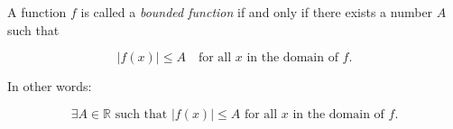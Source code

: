 \documentclass{article}
\begin{document}
A function \( f \) is called a \textit{bounded function} if and only if there exists a number \( A \) such that

\[
|f(x)| \leq A \quad \text{for all } x \text{ in the domain of } f.
\]

In other words:

\[
\exists A \in \mathbb{R} \text{ such that } |f(x)| \leq A \text{ for all } x \text{ in the domain of } f.
\]
\end{document}
